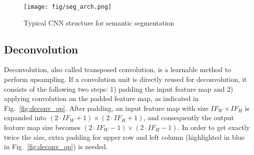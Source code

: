 \documentclass[conference]{IEEEtran}
\begin{document}
\begin{figure}[htbp]
	\centering
	\texttt{[image: fig/seg\_arch.png]}
	\caption{Typical CNN structure for semantic segmentation}
	\label{fig:seg_arch}
\end{figure}

\begin{comment}
\subsection{Convolution}
\st{As the most important operation of CNNs, the convolution layer extracts the features of input feature maps and pushes them to the latter layers. Convolution (in} Fig.~\ref{fig:conv_op}) \st{first multiplies the corresponding elements in the $K\!\times\!K\!\times\!D_{I}$ patch of input image (marked in green) with the kernel (marked in yellow) and then sum all of them up to generate one pixel of output feature map.}
\end{comment}
\begin{comment}
For each channel, convolution consumes 9 multipliers and 8 adders if fully pipelined.

\begin{figure}[htbp]
	\centering
	\texttt{[image: fig/conv\_op.png]}
	\caption{Convolution operation}
	\label{fig:conv_op}
\end{figure}
\end{comment}

\begin{comment}
Convolution involves three-dimensional multiply and accumulate operations of input feature maps and convolution kernel weights. Convolution is comprised of four levels of loops as shown in the pseudo codes in Figure ? and illustrated in Figure ?.
\end{comment}

\subsection{Deconvolution}
Deconvolution, also called transposed convolution, is a learnable method to perform upsampling. If a convolution unit is directly reused for deconvolution, it consists of the following two steps: 1) padding the input feature map and 2) applying convolution on the padded feature map, as indicated in Fig.~\ref{fig:deconv_op}. After padding, an input feature map with size $I\!F_W\times I\!F_H$ is expanded into $(2\cdot I\!F_W+1)\times (2\cdot I\!F_H+1)$, and consequently the output feature map size becomes $(2\cdot I\!F_W-1)\times (2\cdot I\!F_H-1)$. In order to get exactly twice the size, extra padding for upper row and left column (highlighted in blue in Fig.~\ref{fig:deconv_op}) is needed. 
\end{document}
